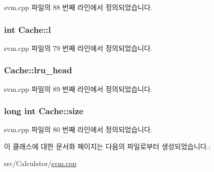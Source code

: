 svm.\+cpp 파일의 88 번째 라인에서 정의되었습니다.

\hypertarget{class_cache_a8f5881aa763cb4af5cfb7b6bda0cff35}{
\subsubsection[{l}]{\setlength{\rightskip}{0pt plus 5cm}int Cache\+::l\hspace{0.3cm}{\ttfamily [private]}}}\label{class_cache_a8f5881aa763cb4af5cfb7b6bda0cff35}


svm.\+cpp 파일의 79 번째 라인에서 정의되었습니다.

\hypertarget{class_cache_a91fc6bd9c69ed37e8e0499da8d47794e}{
\subsubsection[{lru\+\_\+head}]{ Cache\+::lru\+\_\+head\hspace{0.3cm}{\ttfamily [private]}}}\label{class_cache_a91fc6bd9c69ed37e8e0499da8d47794e}


svm.\+cpp 파일의 89 번째 라인에서 정의되었습니다.

\hypertarget{class_cache_af50a89d0734a160cf812384df64599f9}{
\subsubsection[{size}]{\setlength{\rightskip}{0pt plus 5cm}long int Cache\+::size\hspace{0.3cm}{\ttfamily [private]}}}\label{class_cache_af50a89d0734a160cf812384df64599f9}


svm.\+cpp 파일의 80 번째 라인에서 정의되었습니다.



이 클래스에 대한 문서화 페이지는 다음의 파일로부터 생성되었습니다.\+:\begin{DoxyCompactItemize}
\item 
src/\+Calculator/\hyperlink{svm_8cpp}{svm.\+cpp}\end{DoxyCompactItemize}
